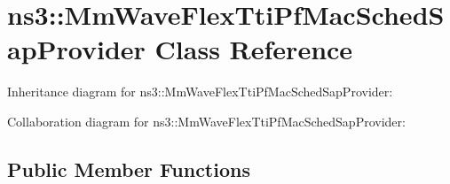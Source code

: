 \hypertarget{classns3_1_1MmWaveFlexTtiPfMacSchedSapProvider}{}\section{ns3\+:\+:Mm\+Wave\+Flex\+Tti\+Pf\+Mac\+Sched\+Sap\+Provider Class Reference}
\label{classns3_1_1MmWaveFlexTtiPfMacSchedSapProvider}


Inheritance diagram for ns3\+:\+:Mm\+Wave\+Flex\+Tti\+Pf\+Mac\+Sched\+Sap\+Provider\+:


Collaboration diagram for ns3\+:\+:Mm\+Wave\+Flex\+Tti\+Pf\+Mac\+Sched\+Sap\+Provider\+:
\subsection*{Public Member Functions}
